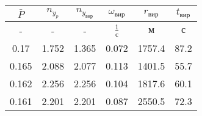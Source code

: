 \begin{tabular}{|c|c|c|c|c|c|}
\hline
$\bar{P}$ & $n_{y_{p}}$ & $n_{y_{вир}}$ & $\omega_{вир}$ & $r_{вир}$ & $t_{вир}$ \\ 
\hline
- & - & - & $\frac{1}{с}$ & $м$ & $с$ \\ 
\hline
0.17 & 1.752 & 1.365 & 0.072 & 1757.4 & 87.2 \\ 
\hline
0.165 & 2.088 & 2.077 & 0.113 & 1401.5 & 55.7 \\ 
\hline
0.162 & 2.256 & 2.256 & 0.104 & 1817.6 & 60.1 \\ 
\hline
0.161 & 2.201 & 2.201 & 0.087 & 2550.5 & 72.3 \\ 
\hline
\end{tabular}